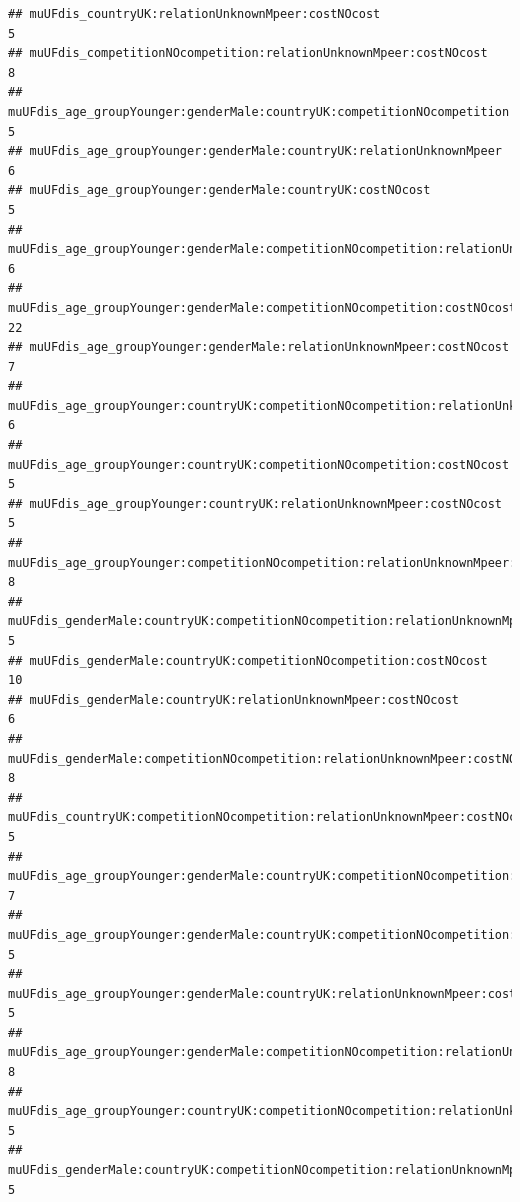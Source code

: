 \documentclass[
]{article}
\begin{document}
\begin{verbatim}
## muUFdis_countryUK:relationUnknownMpeer:costNOcost                                                             5
## muUFdis_competitionNOcompetition:relationUnknownMpeer:costNOcost                                              8
## muUFdis_age_groupYounger:genderMale:countryUK:competitionNOcompetition                                        5
## muUFdis_age_groupYounger:genderMale:countryUK:relationUnknownMpeer                                            6
## muUFdis_age_groupYounger:genderMale:countryUK:costNOcost                                                      5
## muUFdis_age_groupYounger:genderMale:competitionNOcompetition:relationUnknownMpeer                             6
## muUFdis_age_groupYounger:genderMale:competitionNOcompetition:costNOcost                                      22
## muUFdis_age_groupYounger:genderMale:relationUnknownMpeer:costNOcost                                           7
## muUFdis_age_groupYounger:countryUK:competitionNOcompetition:relationUnknownMpeer                              6
## muUFdis_age_groupYounger:countryUK:competitionNOcompetition:costNOcost                                        5
## muUFdis_age_groupYounger:countryUK:relationUnknownMpeer:costNOcost                                            5
## muUFdis_age_groupYounger:competitionNOcompetition:relationUnknownMpeer:costNOcost                             8
## muUFdis_genderMale:countryUK:competitionNOcompetition:relationUnknownMpeer                                    5
## muUFdis_genderMale:countryUK:competitionNOcompetition:costNOcost                                             10
## muUFdis_genderMale:countryUK:relationUnknownMpeer:costNOcost                                                  6
## muUFdis_genderMale:competitionNOcompetition:relationUnknownMpeer:costNOcost                                   8
## muUFdis_countryUK:competitionNOcompetition:relationUnknownMpeer:costNOcost                                    5
## muUFdis_age_groupYounger:genderMale:countryUK:competitionNOcompetition:relationUnknownMpeer                   7
## muUFdis_age_groupYounger:genderMale:countryUK:competitionNOcompetition:costNOcost                             5
## muUFdis_age_groupYounger:genderMale:countryUK:relationUnknownMpeer:costNOcost                                 5
## muUFdis_age_groupYounger:genderMale:competitionNOcompetition:relationUnknownMpeer:costNOcost                  8
## muUFdis_age_groupYounger:countryUK:competitionNOcompetition:relationUnknownMpeer:costNOcost                   5
## muUFdis_genderMale:countryUK:competitionNOcompetition:relationUnknownMpeer:costNOcost                         5

\end{verbatim}
\end{document}
